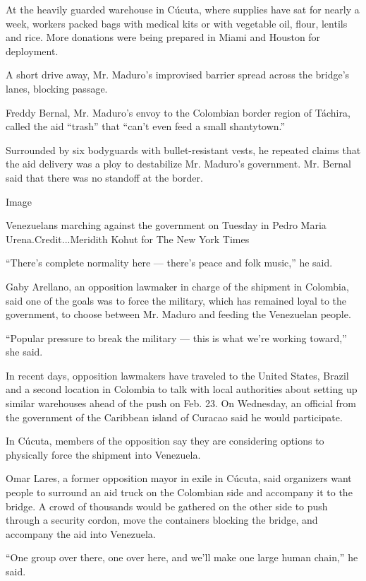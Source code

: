 At the heavily guarded warehouse in Cúcuta, where supplies have sat for
nearly a week, workers packed bags with medical kits or with vegetable
oil, flour, lentils and rice. More donations were being prepared in
Miami and Houston for deployment.

A short drive away, Mr. Maduro's improvised barrier spread across the
bridge's lanes, blocking passage.

Freddy Bernal, Mr. Maduro's envoy to the Colombian border region of
Táchira, called the aid ``trash'' that ``can't even feed a small
shantytown.''

Surrounded by six bodyguards with bullet-resistant vests, he repeated
claims that the aid delivery was a ploy to destabilize Mr. Maduro's
government. Mr. Bernal said that there was no standoff at the border.

Image

Venezuelans marching against the government on Tuesday in Pedro Maria
Urena.Credit...Meridith Kohut for The New York Times

``There's complete normality here --- there's peace and folk music,'' he
said.

Gaby Arellano, an opposition lawmaker in charge of the shipment in
Colombia, said one of the goals was to force the military, which has
remained loyal to the government, to choose between Mr. Maduro and
feeding the Venezuelan people.

``Popular pressure to break the military --- this is what we're working
toward,'' she said.

In recent days, opposition lawmakers have traveled to the United States,
Brazil and a second location in Colombia to talk with local authorities
about setting up similar warehouses ahead of the push on Feb. 23. On
Wednesday, an official from the government of the Caribbean island of
Curacao said he would participate.

In Cúcuta, members of the opposition say they are considering options to
physically force the shipment into Venezuela.

Omar Lares, a former opposition mayor in exile in Cúcuta, said
organizers want people to surround an aid truck on the Colombian side
and accompany it to the bridge. A crowd of thousands would be gathered
on the other side to push through a security cordon, move the containers
blocking the bridge, and accompany the aid into Venezuela.

``One group over there, one over here, and we'll make one large human
chain,'' he said.


